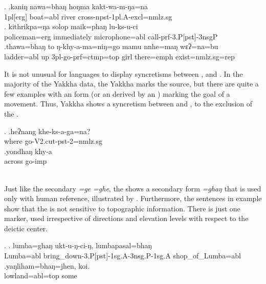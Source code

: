 \ex. \ag.kaniŋ nawa=bhaŋ hoŋma kakt-wa-m-ŋa=na\\
{\sc 1pl[erg]} boat{\sc =abl} river cross{\sc -npst-1pl.A-excl=nmlz.sg}\\
\bg. kithrikpa=ŋa   solop       maik=phaŋ         lu-ks-u-ci\\
policeman{\sc =erg} immediately microphone{\sc =abl} call{\sc -prf-3.P[pst]-3nsgP}\\
\bg.thawa=bhaŋ    to  ŋ-khy-a-ma=niŋ=go                    mamu nnhe=maŋ    wɛʔ=na=bu\\
ladder{\sc =abl} up {\sc 3pl-}go{\sc -prf=ctmp=top} girl there{\sc =emph} exist{\sc [3sg]=nmlz.sg=rep}\\


It is not unusual for  languages to display syncretisms between ,  and  \citep{DeLancey1985_Etymological}. In the majority of the Yakkha data, the Yakkha  marks the source, but there are quite a few examples with an  form (or an  derived by an ) marking the goal of a movement. Thus, Yakkha shows a syncretism between  and , to the exclusion of the .

\ex. \ag.heʔnang khe-ks-a-ga=na?\\
where{\sc [abl]} go{\sc -V2.cut-pst-2=nmlz.sg}\\
\bg.yondhaŋ khy-a\\
across{\sc [abl]} go{\sc -imp}\\
\\

Just like the secondary  \emph{=ge \ti =ghe}, the  shows a secondary form \emph{=ghaŋ} that is used only with human reference, illustrated  by \Next[a]. Furthermore, the sentences in example \Next show that the  is not sensitive to topographic information. There is just one marker, used irrespective of directions and elevation levels with respect to the deictic center.

\ex. \ag. lumba=ghaŋ     ukt-u-ŋ-ci-ŋ,                               lumbapasal=bhaŋ\\
Lumba{\sc =abl} bring\_down{\sc -3.P[pst]-1sg.A-3nsg.P-1sg.A} shop\_of\_Lumba{\sc =abl}\\
 
\bg.yaŋliham=bhaŋ=jhen,    koi.\\
lowland{\sc =abl=top} some\\
 
